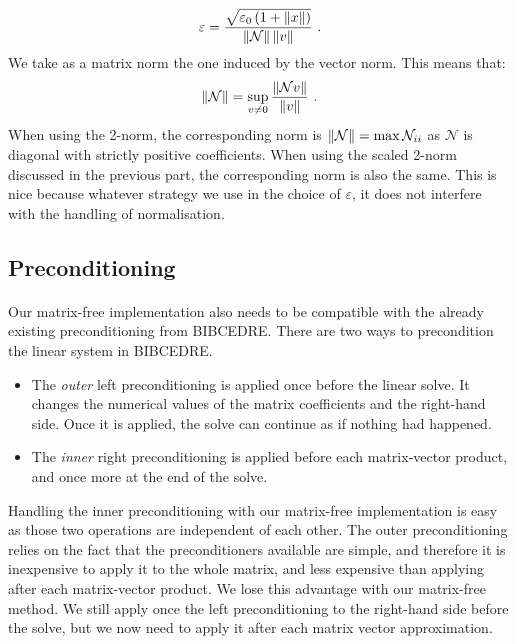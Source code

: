       \begin{equation}
        \varepsilon = \frac{\sqrt{\varepsilon_0 \left(1 + \norm{x}\right) }}{\norm{\mathcal{N}} \norm{v}} \ .
      \end{equation}
      We take as a matrix norm the one induced by the vector norm.
      This means that:
      \begin{equation}
        \norm{\mathcal{N}} = \sup_{v \ne 0} \frac{\norm{\mathcal{N}v}}{\norm{v}} \ .
      \end{equation}
      When using the 2-norm, the corresponding norm is $\norm{\mathcal{N}} = \max{\mathcal{N}_{ii}}$ as $\mathcal{N}$ is diagonal with strictly positive coefficients.
      When using the scaled 2-norm discussed in the previous part, the corresponding norm is also the same.
      This is nice because whatever strategy we use in the choice of $\varepsilon$, it does not interfere with the handling of normalisation.


    \subsection{Preconditioning}

      \paragraph{}
      Our matrix-free implementation also needs to be compatible with the already existing preconditioning from BIBCEDRE.
      There are two ways to precondition the linear system in BIBCEDRE.
      \begin{itemize}
        \item The \emph{outer} left preconditioning is applied once before the linear solve.
          It changes the numerical values of the matrix coefficients and the right-hand side.
          Once it is applied, the solve can continue as if nothing had happened.
        \item The \emph{inner} right preconditioning is applied before each matrix-vector product, and once more at the end of the solve.
      \end{itemize}
      Handling the inner preconditioning with our matrix-free implementation is easy as those two operations are independent of each other.
      The outer preconditioning relies on the fact that the preconditioners available are simple, and therefore it is inexpensive to apply it to the whole matrix, and less expensive than applying after each matrix-vector product.
      We lose this advantage with our matrix-free method.
      We still apply once the left preconditioning to the right-hand side before the solve, but we now need to apply it after each matrix vector approximation.


